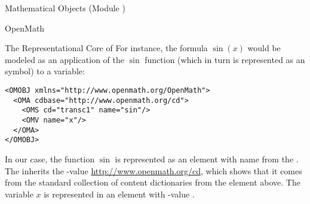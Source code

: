 \begin{tchapter}[id=mobj,short=Mathematical Objects]{Mathematical Objects (Module {})}
\begin{tsection}[id=openmath]{OpenMath}
\begin{tsubsection}[id=om:core]{The Representational Core of {\openmath}}
For instance, the formula $\sin(x)$ would be modeled as an application of the
$\sin$ function (which in turn is represented as an {\openmath} symbol) to a
variable:
\begin{lstlisting}[label=sinx,language=OpenMath,numbers=none,
   index={OMOBJ,OMA,OMV,OMS}]
<OMOBJ xmlns="http://www.openmath.org/OpenMath">
  <OMA cdbase="http://www.openmath.org/cd">
    <OMS cd="transc1" name="sin"/>
    <OMV name="x"/>
  </OMA>
</OMOBJ>   
\end{lstlisting}

In our case, the function $\sin$ is represented as an {} element
with name {} from the {}
{}. The {} inherits the
{}-value \url{http://www.openmath.org/cd}, which shows that it
comes from the {\openmath} standard collection of content dictionaries from the
{} element above.  The variable $x$ is represented in an
{} element with {}-value
{}.


\end{tsubsection}
\end{tsection}
\end{tchapter}
